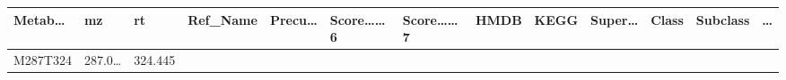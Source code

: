 \documentclass[
]{article}
\begin{document}
\begin{longtable}[]{@{}lllllllllllll@{}}
\begin{minipage}[b]{0.05\columnwidth}
Metab\ldots{}\strut
\end{minipage} & \begin{minipage}[b]{0.05\columnwidth}\raggedright
mz\strut
\end{minipage} & \begin{minipage}[b]{0.05\columnwidth}\raggedright
rt\strut
\end{minipage} & \begin{minipage}[b]{0.05\columnwidth}\raggedright
Ref\_Name\strut
\end{minipage} & \begin{minipage}[b]{0.05\columnwidth}\raggedright
Precu\ldots{}\strut
\end{minipage} & \begin{minipage}[b]{0.07\columnwidth}\raggedright
Score\ldots\ldots6\strut
\end{minipage} & \begin{minipage}[b]{0.07\columnwidth}\raggedright
Score\ldots\ldots7\strut
\end{minipage} & \begin{minipage}[b]{0.05\columnwidth}\raggedright
HMDB\strut
\end{minipage} & \begin{minipage}[b]{0.04\columnwidth}\raggedright
KEGG\strut
\end{minipage} & \begin{minipage}[b]{0.05\columnwidth}\raggedright
Super\ldots{}\strut
\end{minipage} & \begin{minipage}[b]{0.05\columnwidth}\raggedright
Class\strut
\end{minipage} & \begin{minipage}[b]{0.05\columnwidth}\raggedright
Subclass\strut
\end{minipage} & \begin{minipage}[b]{0.02\columnwidth}\raggedright
\ldots{}\strut
\end{minipage}\tabularnewline
\midrule
\endhead
\begin{minipage}[t]{0.05\columnwidth}\raggedright
M287T324\strut
\end{minipage} & \begin{minipage}[t]{0.05\columnwidth}\raggedright
287.0\ldots{}\strut
\end{minipage} & \begin{minipage}[t]{0.05\columnwidth}\raggedright
324.445\strut
\end{minipage} & \begin{minipage}[t]{0.05\columnwidth}\raggedright

\end{minipage}
\end{longtable}
\end{document}
